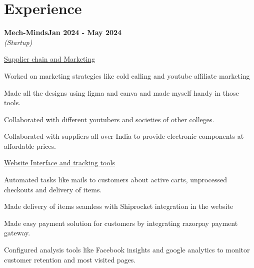 \documentclass[letterpaper,10pt]{article}
\newcommand{\heading}[2]{
  \hspace{10pt}#1\hfill#2\\
}
\newcommand{\headingBf}[2]{
  \heading{\textbf{#1}}{\textbf{#2}}
}
\newcommand{\headingIt}[2]{
  \heading{\textit{#1}}{\textit{#2}}
}
\newenvironment{resume_list}{
  \vspace{-7pt}
  \begin{itemize}[itemsep=-2px, parsep=1pt, leftmargin=30pt]
}{
  \end{itemize}
}
\newcommand{\itemTitle}[1]{
  \item[] \underline{#1}\vspace{4pt}
}
\begin{document}
  


  \section{Experience}

  \headingBf{Mech-Minds}{Jan 2024 - May 2024}
  \headingIt{(Startup)}{}
  \begin{resume_list}
    \itemTitle{Supplier chain and Marketing}
    \item Worked on marketing strategies like cold calling and youtube affiliate marketing
    \item Made all the designs using figma and canva and made myself handy in those tools.
    \item Collaborated with different youtubers and societies of other colleges.
    \item Collaborated with suppliers all over India to provide electronic components at affordable prices.
    \vspace{3pt}
    \itemTitle{Website Interface and tracking tools}
    \item Automated tasks like mails to customers about active carts, unprocessed checkouts and delivery of items.
    \item Made delivery of items seamless with  Shiprocket integration in the website
    \item Made easy payment solution for customers by integrating razorpay payment gateway.
     \item Configured analysis tools like Facebook insights and google analytics to monitor customer retention and most visited pages.
  \end{resume_list}
\end{document}

